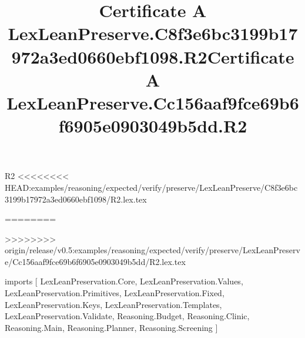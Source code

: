 \begin{lexlean}{R2}
<<<<<<<< HEAD:examples/reasoning/expected/verify/preserve/LexLeanPreserve/C8f3e6bc3199b17972a3ed0660ebf1098/R2.lex.tex
\title{Certificate A LexLeanPreserve.C8f3e6bc3199b17972a3ed0660ebf1098.R2}
========
\title{Certificate A LexLeanPreserve.Cc156aaf9fce69b6f6905e0903049b5dd.R2}
>>>>>>>> origin/release/v0.5:examples/reasoning/expected/verify/preserve/LexLeanPreserve/Cc156aaf9fce69b6f6905e0903049b5dd/R2.lex.tex
\begin{coremodule}
imports [
  LexLeanPreservation.Core,
  LexLeanPreservation.Values,
  LexLeanPreservation.Primitives,
  LexLeanPreservation.Fixed,
  LexLeanPreservation.Keys,
  LexLeanPreservation.Templates,
  LexLeanPreservation.Validate,
  Reasoning.Budget,
  Reasoning.Clinic,
  Reasoning.Main,
  Reasoning.Planner,
  Reasoning.Screening
]


\end{coremodule}
\end{lexlean}
